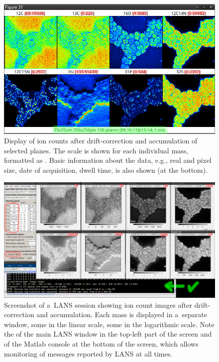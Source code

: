 \begin{figure}[!ht]
\centering
\includegraphics[width=\textwidth]{figs3/LANS-display-accu-planes}
\caption{\label{fig:display-accu-planes}%
Display of ion counts after drift-correction and accumulation of selected planes. The scale is shown for each individual mass, formatted as . Basic information about the data, e.g., real and pixel size, date of acquisition, dwell time, is also shown (at the bottom).}
\end{figure}


\begin{figure}[!ht]
\centering
\includegraphics[width=\textwidth]{figs3/LANS-display-masses}
\caption{\label{fig:display-masses}%
Screenshot of a~LANS session showing ion count images after drift-correction and accumulation. Each mass is displayed in a~separate window, some in the linear scale, some in the logarithmic scale. Note the  of the main LANS window in the top-left part of the screen and of the Matlab console at the bottom of the screen, which allows monitoring of messages reported by LANS at all times.}
\end{figure}

